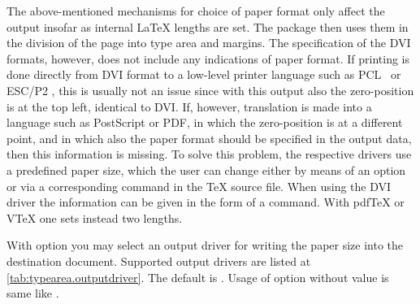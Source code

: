 %
%
\begin{Declaration}
\end{Declaration}%
\begin{Explain}%
  The above-mentioned mechanisms for choice of paper format only
  affect the output insofar as internal {\LaTeX} lengths are set. The
   package then uses them in the division of the
  page into type area and margins. 
  The specification of the DVI
  formats, however, does not include any indications of paper
  format. If printing is done directly from DVI format to a low-level
  printer language such as PCL%
  \iffalse%
  \footnote{PCL is the printer language used by HP for its inkjet and
    laser printers.}%
  \fi \ or ESC/P2%
  \iffalse%
  \footnote{ESC/P2 is the printer language used by EPSON for its
    dot-matrix, inkjet and laser printers.}%
  \fi , this is usually not an issue since with this output also the
  zero-position is at the top left, identical to DVI. If, however,
  translation is made into a language such as
  PostScript or PDF, in which the
  zero-position is at a different point, and in which also the paper
  format should be specified in the output data, then this information
  is missing. To solve this problem, the respective drivers use a
  predefined paper size, which the user can change either by means of
  an option or via a corresponding command in the {\TeX} source
  file. When using the DVI driver  the information can be
  given in the form of a  command. With {pdf\TeX} or
  {V\TeX} one sets instead two lengths.
\end{Explain}
With option  you may select an output driver for writing the
paper size into the destination document. Supported output drivers are listed
at \autoref{tab:typearea.outputdriver}. The default is
. Usage of option
 without value is same like
.
%
